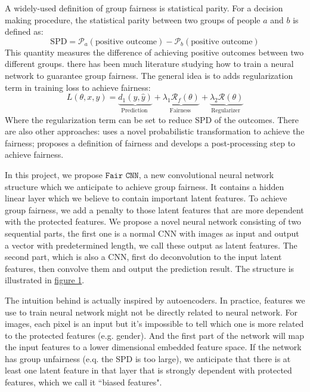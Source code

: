\documentclass{article}
\begin{document}
A widely-used definition of group fairness is statistical parity. For a decision making procedure, the statistical parity between two groups of people $a$ and $b$ is defined as:
$$
\text{SPD} = \mathcal{P}_a(\text{positive outcome}) - \mathcal{P}_b(\text{positive outcome})
$$
This quantity measures the difference of achieving positive outcomes between two different groups. there has been much literature studying how to train a neural network to guarantee group fairness. The general idea \cite{kamishima2011fairness, kamishima2012fairness} is to adds regularization term in training loss to achieve fairness:
$$
L(\theta, x, y)=\underbrace{d_{1}(y, \hat{y})}_{\text {Prediction }}+\underbrace{\lambda_{1} \mathcal{R}_f(\theta)}_{\text {Fairness }}+\underbrace{\lambda_{2} \mathcal{R}(\theta)}_{\text {Regularizer }}
$$
Where the regularization term can be set to reduce SPD of the outcomes. There are also other approaches: \cite{calmon2017optimized} uses a novel probabilistic transformation to achieve the fairness; \cite{hardt2016equality} proposes a definition of fairness and develops a post-processing step to achieve fairness. 





In this project, we propose $\texttt{Fair CNN}$, a new convolutional neural network structure which we anticipate to achieve group fairness. It contains a hidden linear layer which we believe to contain important latent features. To achieve group fairness, we add a penalty to those latent features that are more dependent with the protected features. We propose a novel neural network consisting of two sequential parts, the first one is a normal CNN with images as input and output a vector with predetermined length, we call these output as latent features. The second part, which is also a CNN, first do deconvolution to the input latent features, then convolve them and output the prediction result. The structure is illustrated in \hyperref[fig: 2]{figure 1}.



The intuition behind is actually inspired by autoencoders. In practice, features we use to train neural network might not be directly related to neural network. For images, each pixel is an input but it's impossible to tell which one is more related to the protected features (e.g. gender). And the first part of the network will map the input features to a lower dimensional embedded feature space. If the network has group unfairness (e.q. the SPD is too large), we anticipate that there is at least one latent feature in that layer that is strongly dependent with protected features, which we call it ``biased features".
\end{document}
